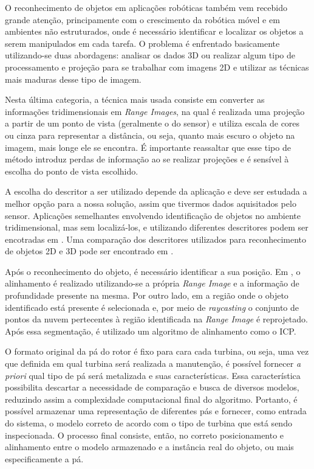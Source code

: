 O reconhecimento de objetos em aplicações robóticas também vem recebido
grande atenção, principamente com o crescimento da robótica móvel e em ambientes
não estruturados, onde é necessário identificar e localizar os objetos a serem
manipulados em cada tarefa. O problema é enfrentado basicamente utilizando-se
duas abordagens: analisar os dados 3D ou realizar algum tipo de processamento e
projeção para se trabalhar com imagens 2D e utilizar as técnicas mais maduras
desse tipo de imagem.


Nesta última categoria, a técnica
mais usada consiste em converter as informações tridimensionais em \textit{Range
Images}, na qual é realizada uma projeção a partir de um ponto de vista (geralmente o do sensor) e utiliza escala
de cores ou cinza para representar a distância, ou seja, quanto mais escuro o
objeto na imagem, mais longe ele se encontra. É importante reassaltar que esse
tipo de método introduz perdas de informação ao se realizar projeções e é
sensível à escolha do ponto de vista escolhido. 

A escolha do descritor a ser
utilizado depende da aplicação e deve ser estudada a melhor opção para a nossa
solução, assim que tivermos dados aquisitados pelo sensor. Aplicações
semelhantes envolvendo identificação de objetos no ambiente tridimensional, mas
sem localizá-los, e utilizando diferentes descritores podem ser encotradas em
\cite{Bayramoglu2010,Hetzel2001,Chen2007}. Uma comparação dos descritores
utilizados para reconhecimento de objetos 2D e 3D pode ser encontrado em \cite{Zaharia2004, Weber2014}.

Após o reconhecimento do objeto, é necessário identificar a sua posição.
Em \cite{Steder2009}, o alinhamento é realizado utilizando-se a própria
\textit{Range Image} e a informação de profundidade presente na mesma. Por outro
lado, em \cite{Nuchter2005} a região onde o objeto identificado está presente é
selecionada e, por meio de \textit{raycasting} o conjunto de pontos da nuvem
pertecentes à região identificada na \textit{Range Image} é reprojetado. Após
essa segmentação, é utilizado um algoritmo de alinhamento como o ICP. 


O formato original da pá do rotor é fixo para cara cada turbina, ou seja, uma
vez que definida em qual turbina será realizada a manutenção, é possível
fornecer \textit{a priori} qual tipo de pá será metalizada e suas
características. Essa característica possibilita descartar a necessidade de comparação e busca de
diversos modelos, reduzindo assim a complexidade computacional final do
algoritmo. Portanto, é possível armazenar uma representação de diferentes pás e
fornecer, como entrada do sistema, o modelo correto de acordo com o tipo de turbina que
está sendo inspecionada. O processo final consiste, então, no correto
posicionamento e alinhamento entre o modelo armazenado e a instância real do
objeto, ou mais especificamente a pá.

